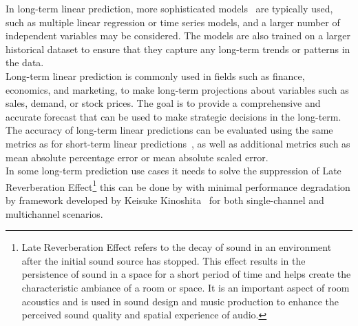 In long-term linear prediction, more sophisticated models~\cite{Nave} are typically used, such as multiple linear
regression or time series models, and a larger number of independent variables may be considered. The models are also
trained on a larger historical dataset to ensure that they capture any long-term trends or patterns in the data.
\\
Long-term linear prediction is commonly used in fields such as finance, economics, and marketing, to make long-term
projections about variables such as sales, demand, or stock prices. The goal is to provide a comprehensive and accurate
forecast that can be used to make strategic decisions in the long-term. The accuracy of long-term linear predictions
can be evaluated using the same metrics as for short-term linear predictions~\cite{Baker}, as well as additional metrics
such as mean absolute percentage error or mean absolute scaled error.
\\
In some long-term prediction use cases it needs to solve the suppression of Late Reverberation
Effect\footnote{Late Reverberation Effect refers to the decay of sound in an environment after the initial sound source
has stopped. This effect results in the persistence of sound in a space for a short period of time and helps create the
characteristic ambiance of a room or space. It is an important aspect of room acoustics and is used in sound
design and music production to enhance the perceived sound quality and spatial experience of audio.} this can be done
by with minimal performance degradation by framework developed by Keisuke Kinoshita~\cite{Kinoshita} for both
single-channel and multichannel scenarios.

